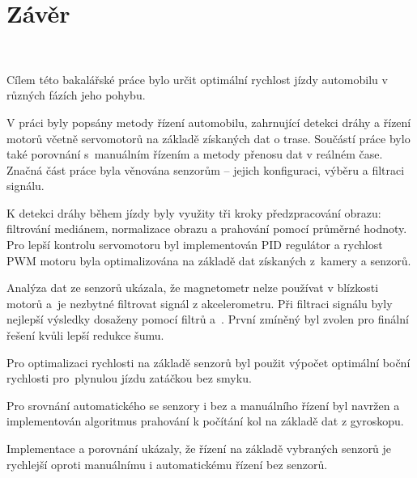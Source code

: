 \chapter{Závěr}
\label{sec:End}
\

Cílem této bakalářské práce bylo určit optimální rychlost jízdy automobilu v různých
fázích jeho pohybu.

V práci byly popsány metody řízení automobilu, zahrnující detekci dráhy a řízení
motorů včetně servomotorů na základě získaných dat o trase. Součástí práce bylo také
porovnání s~manuálním řízením a metody přenosu dat v reálném čase. Značná část práce
byla věnována senzorům – jejich konfiguraci, výběru a filtraci signálu.

K detekci dráhy během jízdy byly využity tři kroky předzpracování obrazu: filtrování
mediánem, normalizace obrazu a prahování pomocí průměrné hodnoty. Pro lepší kontrolu
servomotoru byl implementován PID regulátor a rychlost PWM motoru byla optimalizována
na základě dat získaných z~kamery a senzorů.

Analýza dat ze senzorů ukázala, že magnetometr nelze používat v blízkosti motorů a~je
nezbytné filtrovat signál z akcelerometru. Při filtraci signálu byly nejlepší výsledky 
dosaženy pomocí filtrů  a~. První zmíněný byl zvolen pro finální řešení kvůli lepší redukce šumu.

Pro optimalizaci rychlosti na základě senzorů byl použit výpočet optimální boční
rychlosti pro~plynulou jízdu zatáčkou bez smyku.

Pro srovnání automatického se senzory i bez a manuálního řízení byl navržen 
a implementován algoritmus prahování k počítání kol na základě dat z gyroskopu.

Implementace a porovnání ukázaly, že řízení na základě vybraných senzorů je rychlejší
oproti manuálnímu i automatickému řízení bez senzorů.

\endinput